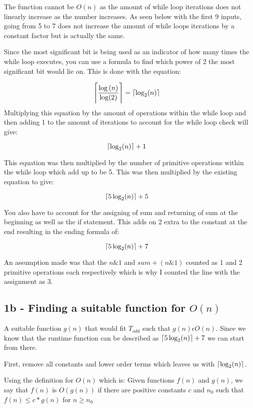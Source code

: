 \documentclass[oneside, a4paper]{article}
\DeclarePairedDelimiter\ceil{\lceil}{\rceil}
\begin{document}
The function cannot be $O(n)$ as the amount of while loop iterations does not linearly increase as the number increases. As seen below with the first 9 inputs, going from 5 to 7 does not increase the amount of while loops iterations by a constant factor but is actually the same.



Since the most significant bit is being used as an indicator of how many times the while loop executes, you can use a formula to find which power of 2 the most significant bit would lie on. This is done with the equation:

$$\ceil[\Bigg]{\frac{\log{(n)}}{\log(2)}} = \ceil{\log_2(n)}$$ 
Multiplying this equation by the amount of operations within the while loop and then adding 1 to the amount of iterations to account for the while loop check will give:

$$\ceil{\log_2(n)}+ 1$$ 

This equation was then multiplied by the number of primitive operations within the while loop which add up to be 5. This was then multiplied by the existing equation to give:

$$\ceil{5\log_2(n)} + 5$$ 

You also have to account for the assigning of sum and returning of sum at the beginning as well as the if statement. This adds on 2 extra to the constant at the end resulting in the ending formula of:

$$\ceil{5\log_2(n)} + 7$$ 

An assumption made was that the $n \& 1$ and $sum + (n \& 1)$ counted as 1 and 2 primitive operations each respectively which is why I counted the line with the assignment as 3.

\subsection{1b - Finding a suitable function for $O(n)$}

A suitable function $g(n)$ that would fit $T_{odd}$ such that $g(n) \epsilon O(n)$. Since we know that the runtime function can be described as $\ceil{5\log_2(n)} + 7$ we can start from there.

First, remove all constants and lower order terms which leaves us with $\ceil{\log_2(n)}$. 

Using the definition for $O(n)$ which is:
Given functions $f(n)$ and $g(n)$, we say that $f(n)$ is $O(g(n))$ if there are positive constants $c$ and $n_0$ such that 
$f(n) \leq c * g(n)$ for $n \geq n_0$
\end{document}
